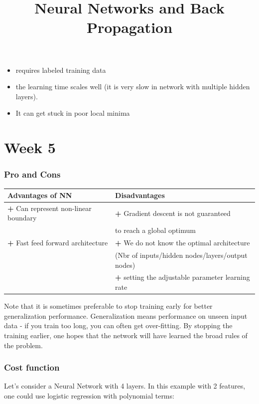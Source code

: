 \documentclass[a4paper,12pt]{report}
\begin{document}
\tableofcontents

\title{Neural Networks and Back Propagation}
\begin{itemize}
\textbf{Back propagation:}
\item requires labeled training data
\item the learning time scales well (it is very slow in network with multiple hidden layers).
\item It can get stuck in poor local minima
\end{itemize}
\maketitle
\part{Week 5}
\section{Pro and Cons}
\begin{table}[H]
\begin{tabular}{|l|l|}
\hline
\hline
Advantages of NN & Disadvantages \\
\hline
\textbf{+} Can represent non-linear boundary &  \textbf{+} Gradient descent is not guaranteed \\
& to reach a global optimum \\
\textbf{+} Fast feed forward architecture &  \textbf{+} We do not know the optimal architecture \\
& (Nbr of inputs/hidden nodes/layers/output nodes) \\
& \textbf{+} setting the adjustable parameter learning rate \\
\hline
\end{tabular}
\end{table}
Note that it is sometimes preferable to stop training early for better generalization performance. Generalization means performance on unseen input data - if you train too long, you can often get over-fitting. By stopping the training earlier, one hopes that the network will have learned the broad rules of the problem.
\section{Cost function}
Let's consider a Neural Network with 4 layers. In this example with 2 features, one could use logistic regression with polynomial terms:
\end{document}
